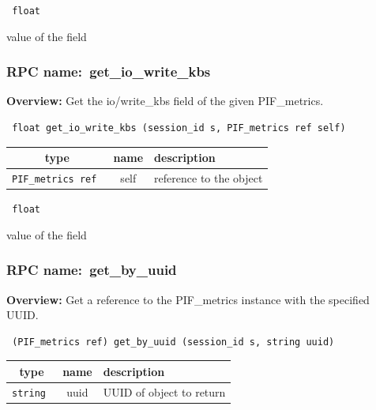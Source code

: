 \vspace{0.3cm}

{\tt 
float
}


value of the field
\vspace{0.3cm}
\vspace{0.3cm}
\vspace{0.3cm}
\subsubsection{RPC name:~get\_io\_write\_kbs}

{\bf Overview:} 
Get the io/write\_kbs field of the given PIF\_metrics.

\begin{verbatim} float get_io_write_kbs (session_id s, PIF_metrics ref self)\end{verbatim}



 
\vspace{0.3cm}
\begin{tabular}{|c|c|p{7cm}|}
 \hline
{\bf type} & {\bf name} & {\bf description} \\ \hline
{\tt PIF\_metrics ref } & self & reference to the object \\ \hline 

\end{tabular}

\vspace{0.3cm}

{\tt 
float
}


value of the field
\vspace{0.3cm}
\vspace{0.3cm}
\vspace{0.3cm}
\subsubsection{RPC name:~get\_by\_uuid}

{\bf Overview:} 
Get a reference to the PIF\_metrics instance with the specified UUID.

\begin{verbatim} (PIF_metrics ref) get_by_uuid (session_id s, string uuid)\end{verbatim}



 
\vspace{0.3cm}
\begin{tabular}{|c|c|p{7cm}|}
 \hline
{\bf type} & {\bf name} & {\bf description} \\ \hline
{\tt string } & uuid & UUID of object to return \\ \hline 

\end{tabular}

